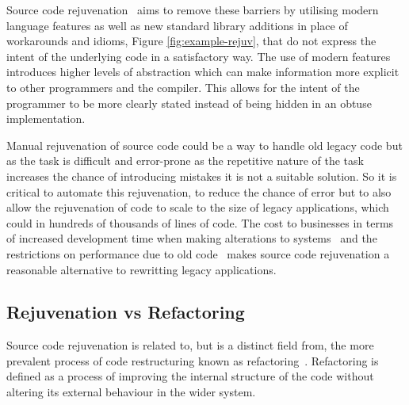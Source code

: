 \documentclass[bsc,frontabs,singlespacing,twoside,parskip,deptreport]{infthesis}
\begin{document}

    
Source code rejuvenation~\cite{STROUSTRUP_REJUV} aims to remove these barriers by utilising modern language features as well as new standard library additions in place of workarounds and idioms, Figure \ref{fig:example-rejuv}, that do not express the intent of the underlying code in a satisfactory way. The use of modern features introduces higher levels of abstraction which can make information more explicit to other programmers and the compiler. This allows for the intent of the programmer to be more clearly stated instead of being hidden in an obtuse implementation. 

Manual rejuvenation of source code could be a way to handle old legacy code but as the task is difficult and error-prone as the repetitive nature of the task increases the chance of introducing mistakes it is not a suitable solution. So it is critical to automate this rejuvenation, to reduce the chance of error but to also allow the rejuvenation of code to scale to the size of legacy applications, which could in hundreds of thousands of lines of code. The cost to businesses in terms of increased development time when making alterations to systems~\cite{LEGACY_MOD} and the restrictions on performance due to old code~\cite{HPC} makes source code rejuvenation a reasonable alternative to rewritting legacy applications.

\subsection{Rejuvenation vs Refactoring}\label{sec:rejuv-vs-refact}

Source code rejuvenation is related to, but is a distinct field from, the more prevalent process of code restructuring known as refactoring~\cite{REFACTOR_BOOK}. Refactoring is defined as a process of improving the internal structure of the code without altering its external behaviour in the wider system. 
\end{document}

